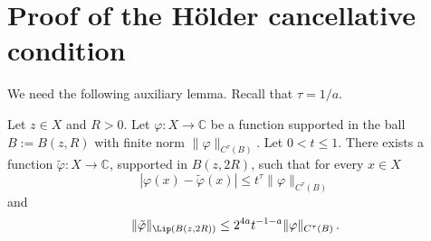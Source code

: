 \chapter{Proof of the H\"older cancellative condition}
\label{liphoel}

We need the following auxiliary lemma.
Recall that $\tau = 1/a$.

\begin{lemma}
    \label{Lipschitz-Holder-approximation}
    Let $z\in X$ and $R>0$. Let $\varphi: X \to \mathbb{C}$ be a function supported in the ball
    $B:=B(z,R)$ with finite norm $\|\varphi\|_{C^\tau(B)}$. Let $0<t \leq 1$. There exists a function $\tilde \varphi : X \to \mathbb{C}$, supported in $B(z,2R)$, such that for every $x\in X$
    \begin{equation}\label{eq-firstt}
        |\varphi(x) - \tilde \varphi(x)| \leq t^{\tau} \|\varphi\|_{C^\tau(B)}
    \end{equation}and
   \begin{equation}\label{eq-secondt}
       \|\tilde \varphi\|_{\Lip(B(z,2R))} \leq 2^{4a}t^{-1-a} \|\varphi\|_{C^{\tau}(B)}\, .
   \end{equation}
\end{lemma}


